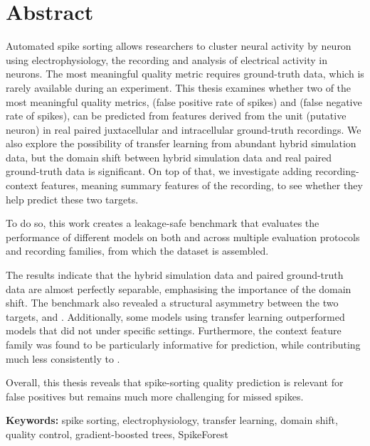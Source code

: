 \chapter*{Abstract}

Automated spike sorting allows researchers to cluster neural activity by neuron using electrophysiology, the recording and analysis of electrical activity in neurons. The most meaningful quality metric requires ground-truth data, which is rarely available during an experiment. This thesis examines whether two of the most meaningful quality metrics, \fpos{} (false positive rate of spikes) and \fmiss{} (false negative rate of spikes), can be predicted from features derived from the unit (putative neuron) in real paired juxtacellular and intracellular ground-truth recordings. We also explore the possibility of transfer learning from abundant hybrid simulation data, but the domain shift between hybrid simulation data and real paired ground-truth data is significant. On top of that, we investigate adding recording-context features, meaning summary features of the recording, to see whether they help predict these two targets.

To do so, this work creates a leakage-safe benchmark that evaluates the performance of different models on both \fmiss{} and \fpos{} across multiple evaluation protocols and recording families, from which the dataset is assembled.

The results indicate that the hybrid simulation data and paired ground-truth data are almost perfectly separable, emphasising the importance of the domain shift. The benchmark also revealed a structural asymmetry between the two targets, \fmiss{} and \fpos{}. Additionally, some models using transfer learning outperformed models that did not under specific settings. Furthermore, the context feature family was found to be particularly informative for \fpos{} prediction, while contributing much less consistently to \fmiss{}.

Overall, this thesis reveals that spike-sorting quality prediction is relevant for false positives but remains much more challenging for missed spikes.

\vspace{0.8em}
\noindent\textbf{Keywords:} spike sorting, electrophysiology, transfer learning, domain shift, quality control, gradient-boosted trees, SpikeForest
